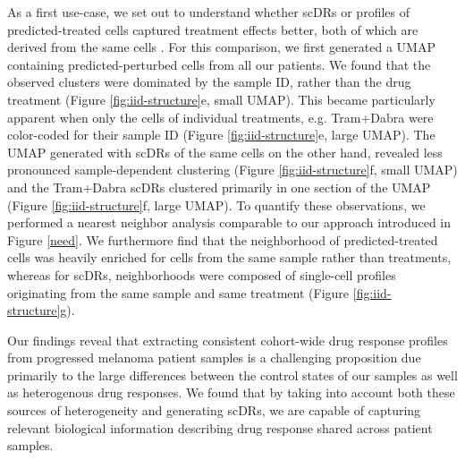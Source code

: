 As a first use-case, we set out to understand whether scDRs or profiles of predicted-treated cells captured treatment effects better, both of which are derived from the same cells .
 For this comparison, we first generated a UMAP containing predicted-perturbed cells from all our patients.
 We found that the observed clusters were dominated by the sample ID, rather than the drug treatment (Figure \ref{fig:iid-structure}e, small UMAP).
 This became particularly apparent when only the cells of individual treatments, e.g. Tram+Dabra were color-coded for their sample ID (Figure \ref{fig:iid-structure}e, large UMAP).
 The UMAP generated with scDRs of the same cells on the other hand, revealed less pronounced sample-dependent clustering (Figure \ref{fig:iid-structure}f, small UMAP) and the Tram+Dabra scDRs clustered primarily in one section of the UMAP (Figure \ref{fig:iid-structure}f, large UMAP).
 To quantify these observations, we performed a nearest neighbor analysis comparable to our approach introduced in Figure \ref{need}.
We furthermore find that the neighborhood of predicted-treated cells was heavily enriched for cells from the same sample rather than treatments, whereas for scDRs, neighborhoods were composed of single-cell profiles originating from the same sample and same treatment (Figure \ref{fig:iid-structure}g).

Our findings reveal that extracting consistent cohort-wide drug response profiles from progressed melanoma patient samples is a challenging proposition due primarily to the large differences between the control states of our samples as well as heterogenous drug responses.
 We found that by taking into account both these sources of heterogeneity and generating scDRs, we are capable of capturing relevant biological information describing drug response shared across patient samples. 


